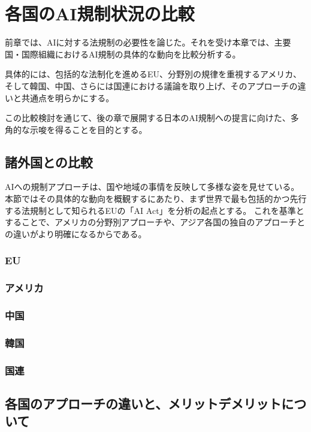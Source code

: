 \chapter{各国のAI規制状況の比較}

前章では、AIに対する法規制の必要性を論じた。それを受け本章では、主要国・国際組織におけるAI規制の具体的な動向を比較分析する。

具体的には、包括的な法制化を進めるEU、分野別の規律を重視するアメリカ、そして韓国、中国、さらには国連における議論を取り上げ、そのアプローチの違いと共通点を明らかにする。

この比較検討を通じて、後の章で展開する日本のAI規制への提言に向けた、多角的な示唆を得ることを目的とする。

\section{諸外国との比較}

AIへの規制アプローチは、国や地域の事情を反映して多様な姿を見せている。本節ではその具体的な動向を概観するにあたり、まず世界で最も包括的かつ先行する法規制として知られるEUの「AI Act」を分析の起点とする。
これを基準とすることで、アメリカの分野別アプローチや、アジア各国の独自のアプローチとの違いがより明確になるからである。

\subsection{EU}

\subsection{アメリカ}

\subsection{中国}

\subsection{韓国}

\subsection{国連}

\section{各国のアプローチの違いと、メリットデメリットについて}
